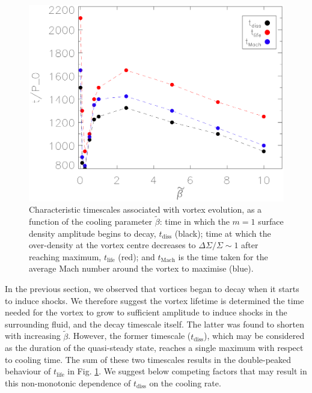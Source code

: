 \begin{figure}
  \includegraphics[width=\linewidth]{figures/betaplot}
  \caption{Characteristic timescales associated with vortex evolution, as a function of the cooling
    parameter $\tilde\beta$: time in which the $m=1$
    surface density amplitude begins to decay, $t_\mathrm{diss}$ (black);
    time at which the over-density at the
    vortex centre decreases to $\Delta\Sigma/\Sigma \sim 1$ after
    reaching maximum, $t_\mathrm{life}$ (red);
    and $t_\mathrm{Mach}$ is the time taken
    for the average Mach number around the vortex to maximise
    (blue). \label{betaplot}}  
\end{figure}

In the previous section, we observed that vortices began to decay when
it starts to induce shocks. We therefore suggest the vortex lifetime
is determined the time needed for the vortex to grow to 
sufficient amplitude to induce shocks in the surrounding fluid, and 
the decay timescale itself. The latter was found to shorten 
with increasing $\tilde{\beta}$. However, the former timescale
($t_\mathrm{diss}$), which may be considered as the 
duration of the quasi-steady state, reaches a single maximum with
respect to cooling time. The sum of these two timescales results in the
double-peaked behaviour of $t_\mathrm{life}$ in Fig. \ref{betaplot}. 
We suggest below competing factors that may result in this
non-monotonic dependence of $t_\mathrm{diss}$ on the cooling rate.  

